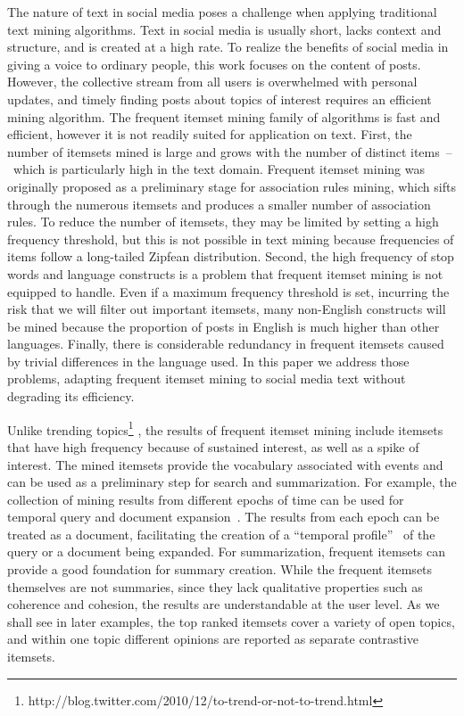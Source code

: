 \documentclass[letterpaper,12pt,titlepage,oneside,final]{book}
\begin{document}
The nature of text in social media poses a challenge when applying
traditional text mining algorithms.
Text in social media is usually short, lacks context and structure,
and is created at a high rate. %
To realize the benefits of social media in giving a voice to ordinary people,
this work focuses on the content of posts.
However, the collective stream from all users is overwhelmed with personal
updates, and timely finding posts about topics of interest requires an
efficient mining algorithm.
The frequent itemset mining family of algorithms is fast and efficient,
however it is not readily suited for application on text.
First, the number of itemsets mined is large and grows with the number of
distinct items~--~which is particularly high in the text domain.
Frequent itemset mining was originally proposed as a preliminary stage for
association rules mining, which sifts through the numerous itemsets and
produces a smaller number of association rules.
To reduce the number of itemsets, they may be limited by setting a high
frequency threshold, but this is not possible in text mining because
frequencies of items follow a long-tailed Zipfean distribution.
Second, the high frequency of stop words and language constructs is a problem
that frequent itemset mining is not equipped to handle.
Even if a maximum frequency threshold is set, incurring the risk that we
will filter out important itemsets, many  non-English constructs will be
mined because the proportion of posts in English is much higher than
other languages.  Finally, there is considerable redundancy in frequent
itemsets caused by trivial differences in the language used.
In this paper we address those problems, adapting frequent itemset mining to
social media text without degrading its efficiency.

Unlike trending
topics\footnote{http://blog.twitter.com/2010/12/to-trend-or-not-to-trend.html}
\cite{mathioudakis2010twittermonitor}, the results of frequent itemset
mining include itemsets that have high frequency because of sustained interest,
as well as a spike of interest.
The mined itemsets provide the vocabulary associated with events and can be
used as a preliminary step for search and summarization.
For example, the collection of mining results from different epochs of time
can be used for temporal query and document
expansion~\cite{choi2012temporal, efron2012improving}.
The results from each epoch can be treated as a document, facilitating the
creation of a ``temporal profile''~\cite{jones2007temporal} of the query
or a document being expanded.
For summarization, frequent itemsets can provide a good foundation for summary
creation.
While the frequent itemsets themselves are not summaries, since they lack
qualitative properties such as coherence and cohesion, the results are
understandable at the user level.
As we shall see in later examples, the top ranked itemsets cover a variety
of open topics, and within one topic different opinions are reported as
separate contrastive itemsets.
\end{document}
